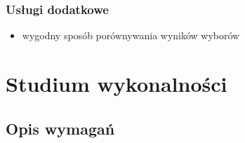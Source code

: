 \documentclass[polish,11pt]{aghthesis}
\begin{document}
\subsubsection{Usługi dodatkowe}
\begin{itemize}
	\item wygodny sposób porównywania wyników wyborów
\end{itemize}


\section{Studium wykonalności}
  
\subsection{Opis wymagań}
\end{document}
